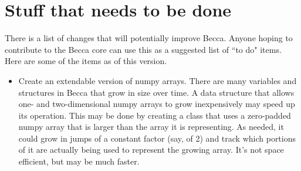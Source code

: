 \chapter{Stuff that needs to be done}

There is a list of changes that will potentially improve Becca. Anyone hoping to contribute to the Becca core can use this as a suggested list of ``to do" items. Here are some of the items as of this version.

\begin{itemize}
\item{Create an extendable version of numpy arrays. There are many variables and structures in Becca that grow in size over time. A data structure that allows one- and two-dimensional numpy arrays to grow inexpensively may speed up its operation. This may be done by creating a class that uses a zero-padded numpy array that is larger than the array it is representing. As needed, it could grow in jumps of a constant factor (say, of 2) and track which portions of it are actually being used to represent the growing array. It's not space efficient, but may be much faster.}

\end{itemize}